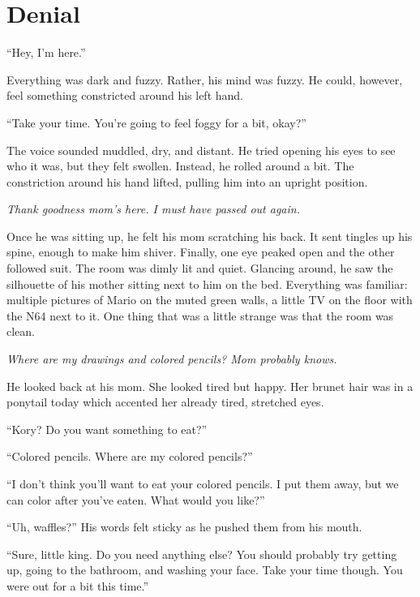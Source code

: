 \chapter*{Denial}


``Hey, I'm here.''

Everything was dark and fuzzy. Rather, his mind was fuzzy. He could, however, feel something constricted around his left hand.

``Take your time. You're going to feel foggy for a bit, okay?''

The voice sounded muddled, dry, and distant. He tried opening his eyes to see who it was, but they felt swollen. Instead, he rolled around a bit. The constriction around his hand lifted, pulling him into an upright position.

\textit{Thank goodness mom's here. I must have passed out again.}

Once he was sitting up, he felt his mom scratching his back. It sent tingles up his spine, enough to make him shiver. Finally, one eye peaked open and the other followed suit. The room was dimly lit and quiet. Glancing around, he saw the silhouette of his mother sitting next to him on the bed. Everything was familiar: multiple pictures of Mario on the muted green walls, a little TV on the floor with the N64 next to it. One thing that was a little strange was that the room was clean.

\textit{Where are my drawings and colored pencils? Mom probably knows.}

He looked back at his mom. She looked tired but happy. Her brunet hair was in a ponytail today which accented her already tired, stretched eyes.

``Kory? Do you want something to eat?''

``Colored pencils. Where are my colored pencils?''

``I don't think you'll want to eat your colored pencils. I put them away, but we can color after you've eaten. What would you like?''

``Uh, waffles?'' His words felt sticky as he pushed them from his mouth.

``Sure, little king. Do you need anything else? You should probably try getting up, going to the bathroom, and washing your face. Take your time though. You were out for a bit this time.''

